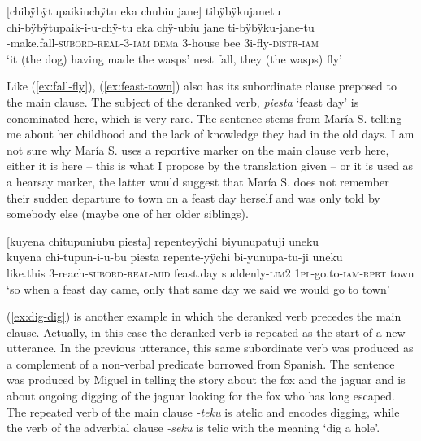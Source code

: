 \ea\label{ex:fall-fly}
\begingl
\glpreamble \textup{[}chibÿbÿtupaikiuchÿtu eka chubiu jane\textup{]} tibÿbÿkujanetu\\
\gla chi-bÿbÿtupaik-i-u-chÿ-tu eka chÿ-ubiu jane ti-bÿbÿku-jane-tu\\
-make.fall-\textsc{subord}-\textsc{real}-3-\textsc{iam} \textsc{dem}a 3-house bee 3i-fly-\textsc{distr}-\textsc{iam}\\
\glft ‘it (the dog) having made the wasps’ nest fall, they (the wasps) fly’
\endgl
\trailingcitation{[mox-a110920l-2.080]}
\xe

Like (\ref{ex:fall-fly}), (\ref{ex:feast-town}) also has its subordinate clause preposed to the main clause. The subject of the deranked verb, \textit{piesta} ‘feast day’ is conominated here, which is very rare. The sentence stems from María S. telling me about her childhood and the lack of knowledge they had in the old days. I am not sure why María S. uses a reportive marker on the main clause verb here, either it is  here – this is what I propose by the translation given – or it is used as a hearsay marker, the latter would suggest that María S. does not remember their sudden departure to town on a feast day herself and was only told by somebody else (maybe one of her older siblings).

\ea\label{ex:feast-town}
\begingl
\glpreamble \textup{[}kuyena chitupuniubu piesta\textup{]} repenteyÿchi biyunupatuji uneku\\
\gla kuyena chi-tupun-i-u-bu piesta repente-yÿchi bi-yunupa-tu-ji uneku\\
\glb like.this 3-reach-\textsc{subord}-\textsc{real}-\textsc{mid} feast.day suddenly-\textsc{lim}2 1\textsc{pl}-go.to-\textsc{iam}-\textsc{rprt} town\\
\glft ‘so when a feast day came, only that same day we said we would go to town’
\endgl
\trailingcitation{[rxx-p181101l-2.017]}
\xe


(\ref{ex:dig-dig}) is another example in which the deranked verb precedes the main clause. Actually, in this case the deranked verb is repeated as the start of a new utterance. In the previous utterance, this same subordinate verb was produced as a complement of a non-verbal predicate borrowed from Spanish. The sentence was produced by Miguel in telling the story about the fox and the jaguar and is about ongoing digging of the jaguar looking for the fox who has long escaped. The repeated verb of the main clause \textit{-teku} is atelic and encodes digging, while the verb of the adverbial clause \textit{-seku} is telic with the meaning ‘dig a hole’.

